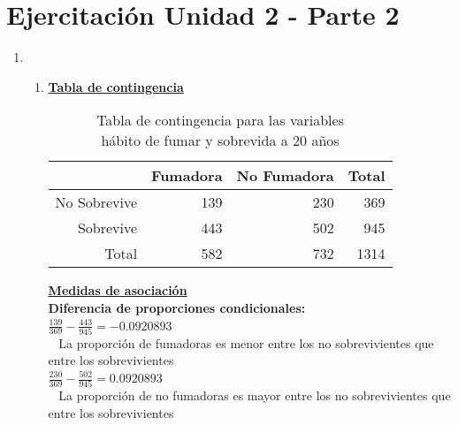 \documentclass[12pt,letterpaper,fleqn]{article}
\begin{document}
    \section*{Ejercitación Unidad 2 - Parte 2}

    \begin{enumerate}[label=\textbf{\arabic*.}]

        \item
            \begin{enumerate}[label=\textbf{\alph*.}]
                \item \underline{\textbf{Tabla de contingencia}} %
                    \begin{table}[ht]
                        \centering
                        \caption{Tabla de contingencia para las variables \\ hábito de fumar y sobrevida a 20 años}
                        \begin{threeparttable}
                            \begin{tabular}{rrrr}
                                \hline
                                & Fumadora & No Fumadora \vline & Total \\
                                \hline
                                No Sobrevive & 139 & 230 \vline & 369 \\
                                Sobrevive & 443 & 502 \vline & 945 \\
                                \hline
                                Total & 582 & 732 \vline & 1314 \\
                                \hline
                            \end{tabular}
                        \end{threeparttable}
                    \end{table}

                    \underline{\textbf{Medidas de asociación}} \\
                    \textbf{Diferencia de proporciones condicionales:} \\
                    $ \frac{139}{369}-\frac{443}{945} = -0.0920893 $ \\ 
                    La proporción de fumadoras es menor entre los no sobrevivientes que entre los sobrevivientes \\
                    $ \frac{230}{369}-\frac{502}{945} = 0.0920893 $ \\ 
                    La proporción de no fumadoras es mayor entre los no sobrevivientes que entre los sobrevivientes\\


\end{enumerate}
\end{enumerate}
\end{document}
